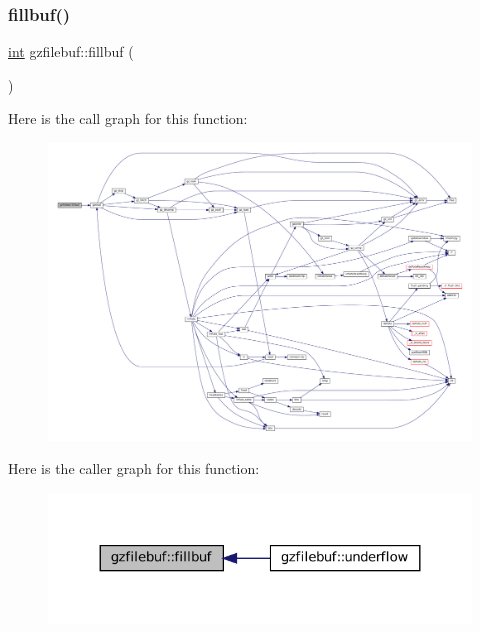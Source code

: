 \subsubsection{\texorpdfstring{fillbuf()}{fillbuf()}}
{\footnotesize\ttfamily \mbox{\hyperlink{ioapi_8h_a787fa3cf048117ba7123753c1e74fcd6}{int}} gzfilebuf\+::fillbuf (\begin{DoxyParamCaption}{ }\end{DoxyParamCaption})\hspace{0.3cm}{\ttfamily [private]}}

Here is the call graph for this function\+:
\nopagebreak
\begin{figure}[H]
\begin{center}
\leavevmode
\includegraphics[width=350pt]{classgzfilebuf_ac8e1bd83de7533320523fa91ad3355d7_cgraph}
\end{center}
\end{figure}
Here is the caller graph for this function\+:
\nopagebreak
\begin{figure}[H]
\begin{center}
\leavevmode
\includegraphics[width=324pt]{classgzfilebuf_ac8e1bd83de7533320523fa91ad3355d7_icgraph}
\end{center}
\end{figure}
\mbox{\label{classgzfilebuf_aa425fda69e0eb2c94231399652491ff0}} 
